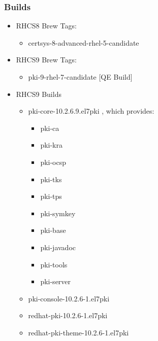 \documentclass[12pt]{report}
\begin{document}
    \subsubsection{Builds}
        \begin{itemize}
            \item RHCS8 Brew Tags:
                \begin{itemize}
                    \item certsys-8-advanced-rhel-5-candidate
                \end{itemize}
            \item RHCS9 Brew Tags:
                \begin{itemize}
                    \item pki-9-rhel-7-candidate [QE Build]
                \end{itemize}
            \item RHCS9 Builds
                \begin{itemize}
                    \item pki-core-10.2.6.9.el7pki , which provides:
                        \begin{itemize}
                            \item pki-ca
                            \item pki-kra
                            \item pki-ocsp
                            \item pki-tks
                            \item pki-tps
                            \item pki-symkey
                            \item pki-base
                            \item pki-javadoc
                            \item pki-tools
                            \item pki-server
                        \end{itemize}
                    \item pki-console-10.2.6-1.el7pki
                    \item redhat-pki-10.2.6-1.el7pki
                    \item redhat-pki-theme-10.2.6-1.el7pki
                \end{itemize}
        \end{itemize}
\end{document}
